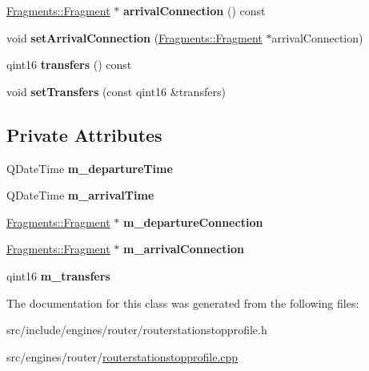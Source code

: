 \begin{DoxyCompactItemize}
\item 
\mbox{\label{classRouterEngine_1_1StationStopProfile_a6ee8ca835f4e35c854f216feb04c18be}} 
\mbox{\hyperlink{classFragments_1_1Fragment}{Fragments\+::\+Fragment}} $\ast$ {\bfseries arrival\+Connection} () const
\item 
\mbox{\label{classRouterEngine_1_1StationStopProfile_acdd5cf23ce995fb0c00d511af94221be}} 
void {\bfseries set\+Arrival\+Connection} (\mbox{\hyperlink{classFragments_1_1Fragment}{Fragments\+::\+Fragment}} $\ast$arrival\+Connection)
\item 
\mbox{\label{classRouterEngine_1_1StationStopProfile_a30cebe57a2d83b2bccc7096e718a20db}} 
qint16 {\bfseries transfers} () const
\item 
\mbox{\label{classRouterEngine_1_1StationStopProfile_a2ed64bade1f468a94185a14efd495e37}} 
void {\bfseries set\+Transfers} (const qint16 \&transfers)
\end{DoxyCompactItemize}
\subsection*{Private Attributes}
\begin{DoxyCompactItemize}
\item 
\mbox{\label{classRouterEngine_1_1StationStopProfile_a97eb98be57364fdd9e77e29de14579b5}} 
Q\+Date\+Time {\bfseries m\+\_\+departure\+Time}
\item 
\mbox{\label{classRouterEngine_1_1StationStopProfile_a354f6857e93c542d6fbb08113d33e611}} 
Q\+Date\+Time {\bfseries m\+\_\+arrival\+Time}
\item 
\mbox{\label{classRouterEngine_1_1StationStopProfile_a99630a13e3e7fd440d28e61fa29ab56b}} 
\mbox{\hyperlink{classFragments_1_1Fragment}{Fragments\+::\+Fragment}} $\ast$ {\bfseries m\+\_\+departure\+Connection}
\item 
\mbox{\label{classRouterEngine_1_1StationStopProfile_a7623369a846a96a0cf5fc3e9e23b8aaa}} 
\mbox{\hyperlink{classFragments_1_1Fragment}{Fragments\+::\+Fragment}} $\ast$ {\bfseries m\+\_\+arrival\+Connection}
\item 
\mbox{\label{classRouterEngine_1_1StationStopProfile_adbafbfbe7205c1983575102a5eea0b53}} 
qint16 {\bfseries m\+\_\+transfers}
\end{DoxyCompactItemize}


The documentation for this class was generated from the following files\+:\begin{DoxyCompactItemize}
\item 
src/include/engines/router/routerstationstopprofile.\+h\item 
src/engines/router/\mbox{\hyperlink{routerstationstopprofile_8cpp}{routerstationstopprofile.\+cpp}}\end{DoxyCompactItemize}
